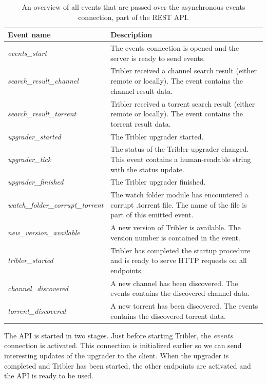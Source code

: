 \begin{table}
	\begin{tabularx}{\textwidth}{|l|X|}
		\hline
		\textbf{Event name} & \textbf{Description} \\ \hline
		\emph{events\_start} & The events connection is opened and the server is ready to send events.  \\ \hline
		\emph{search\_result\_channel} & Tribler received a channel search result (either remote or locally). The event contains the channel result data. \\ \hline
		\emph{search\_result\_torrent} & Tribler received a torrent search result (either remote or locally). The event contains the torrent result data. \\ \hline
		\emph{upgrader\_started} & The Tribler upgrader started. \\ \hline
		\emph{upgrader\_tick} & The status of the Tribler upgrader changed. This event contains a human-readable string with the status update. \\ \hline
		\emph{upgrader\_finished} & The Tribler upgrader finished. \\ \hline
		\emph{watch\_folder\_corrupt\_torrent} & The watch folder module has encountered a corrupt .torrent file. The name of the file is part of this emitted event.\\ \hline
		\emph{new\_version\_available} & A new version of Tribler is available. The version number is contained in the event.\\ \hline
		\emph{tribler\_started} & Tribler has completed the startup procedure and is ready to serve HTTP requests on all endpoints.\\ \hline
		\emph{channel\_discovered} & A new channel has been discovered. The events contains the discovered channel data.\\ \hline
		\emph{torrent\_discovered} & A new torrent has been discovered. The events contains the discovered torrent data.\\ \hline
	\end{tabularx}
	\caption{An overview of all events that are passed over the asynchronous events connection, part of the REST API.}
	\label{table:rest-api-events}
\end{table}

The API is started in two stages. Just before starting Tribler, the \emph{events} connection is activated. This connection is initialized earlier so we can send interesting updates of the upgrader to the client. When the upgrader is completed and Tribler has been started, the other endpoints are activated and the API is ready to be used.

